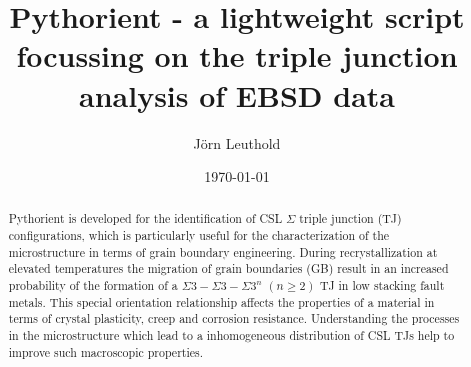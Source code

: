 \documentclass{article}
\title{Pythorient - a lightweight script focussing on the triple junction analysis of EBSD data}
\author{J\"orn Leuthold}
\date{\today}
\begin{document}
\maketitle


\begin{abstract}
Pythorient is developed for the identification of CSL $\Sigma$ triple junction (TJ) configurations, which is particularly useful for the characterization of the microstructure in terms of grain boundary engineering. During recrystallization at elevated temperatures the migration of grain boundaries (GB) result in an increased probability of the formation of a $\Sigma3-\Sigma3-\Sigma3^n$ $(n \geq 2)$ TJ in low stacking fault metals. This special orientation relationship affects the properties of a material in terms of crystal plasticity, creep and corrosion resistance. Understanding the processes in the microstructure which lead to a inhomogeneous distribution of CSL TJs help to improve such macroscopic properties.


\end{abstract}
\end{document}
